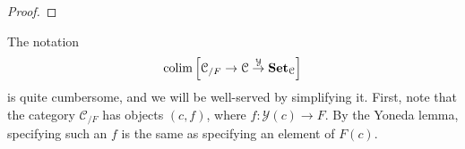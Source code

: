 \documentclass[main.tex]{subfiles}
\begin{document}
\begin{proof}
%
\end{proof}

The notation
\begin{equation*}
  \operatorname*{colim} \left[ \mathcal{C}_{/F} \to \mathcal{C} \overset{\mathcal{Y}}{\to} \mathbf{Set}_{\mathcal{C}} \right]
\end{equation*}
is quite cumbersome, and we will be well-served by simplifying it. First, note that the category $\mathcal{C}_{/F}$ has objects $(c, f)$, where $f\colon \mathcal{Y}(c) \to F$. By the Yoneda lemma, specifying such an $f$ is the same as specifying an element of $F(c)$.
\end{document}
